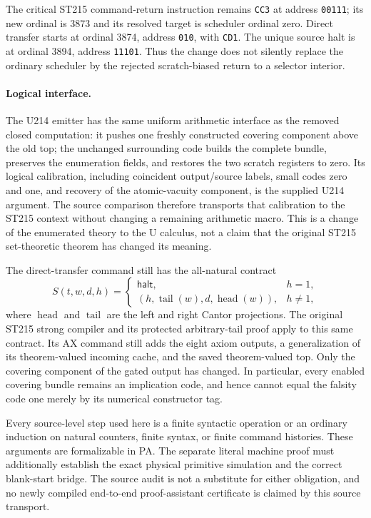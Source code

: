 The critical ST215 command-return instruction remains
\texttt{CC3} at address \texttt{00111}; its new ordinal is 3873 and its
resolved target is scheduler ordinal zero.  Direct transfer starts at
ordinal 3874, address \texttt{010}, with \texttt{CD1}.  The unique source
halt is at ordinal 3894, address \texttt{11101}.  Thus the change does not
silently replace the ordinary scheduler by the rejected scratch-biased
return to a selector interior.

\paragraph{Logical interface.}
The U214 emitter has the same uniform arithmetic interface as the removed
closed computation: it pushes one freshly constructed covering component above the old
top; the unchanged surrounding code builds the complete bundle, preserves the enumeration fields, and restores the two scratch registers
to zero.  Its logical calibration, including coincident output/source labels,
small codes zero and one, and recovery of the atomic-vacuity component, is
the supplied U214 argument.  The source comparison therefore transports that
calibration to the ST215 context without changing a remaining arithmetic
macro.  This is a change of the enumerated theory to the U calculus, not a
claim that the original ST215 set-theoretic theorem has changed its meaning.

The direct-transfer command still has the all-natural contract
\[
 S(t,w,d,h)=
 \begin{cases}
  \mathsf{halt},& h=1,\\
  (h,\operatorname{tail}(w),d,\operatorname{head}(w)),&h\ne1,
 \end{cases}
\]
where $\operatorname{head}$ and $\operatorname{tail}$ are the left and right
Cantor projections.  The original ST215 strong compiler and its protected
arbitrary-tail proof apply to this same contract.  Its AX command still adds
the eight axiom outputs, a generalization of its theorem-valued incoming
cache, and the saved theorem-valued top.  Only the covering component of the gated output
has changed.  In particular, every enabled covering bundle remains an
implication code, and hence cannot equal the falsity code one merely by its
numerical constructor tag.

Every source-level step used here is a finite syntactic operation or an
ordinary induction on natural counters, finite syntax, or finite command
histories.  These arguments are formalizable in PA.  The separate literal
machine proof must additionally establish the exact physical primitive
simulation and the correct blank-start bridge.  The source audit is not a
substitute for either obligation, and no newly compiled end-to-end
proof-assistant certificate is claimed by this source transport.

